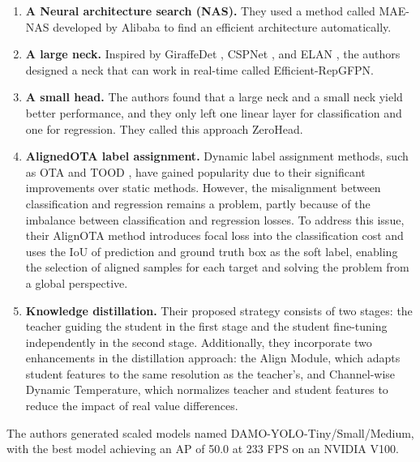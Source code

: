 \documentclass{article}
\begin{document}
\begin{enumerate}
    \item \textbf{A Neural architecture search (NAS).} They used a method called MAE-NAS \cite{TinyNAS} developed by Alibaba to find an efficient architecture automatically.
    \item \textbf{A large neck.} Inspired by GiraffeDet \cite{jiang2022giraffedet}, CSPNet \cite{wang2020cspnet}, and ELAN \cite{wang2022designing}, the authors designed a neck that can work in real-time called Efficient-RepGFPN.
    \item \textbf{A small head.} The authors found that a large neck and a small neck yield better performance, and they only left one linear layer for classification and one for regression. They called this approach ZeroHead.
    \item \textbf{AlignedOTA label assignment.} Dynamic label assignment methods, such as OTA \cite{ge2021ota} and TOOD \cite{feng2021tood}, have gained popularity due to their significant improvements over static methods. However, the misalignment between classification and regression remains a problem, partly because of the imbalance between classification and regression losses. To address this issue, their AlignOTA method introduces focal loss \cite{8417976} into the classification cost and uses the IoU of prediction and ground truth box as the soft label, enabling the selection of aligned samples for each target and solving the problem from a global perspective.
    \item \textbf{Knowledge distillation.} Their proposed strategy consists of two stages: the teacher guiding the student in the first stage and the student fine-tuning independently in the second stage. Additionally, they incorporate two enhancements in the distillation approach: the Align Module, which adapts student features to the same resolution as the teacher’s, and Channel-wise Dynamic Temperature, which normalizes teacher and student features to reduce the impact of real value differences.
\end{enumerate}

The authors generated scaled models named DAMO-YOLO-Tiny/Small/Medium, with the best model achieving an AP of 50.0 at 233 FPS on an NVIDIA V100.

\end{document}

